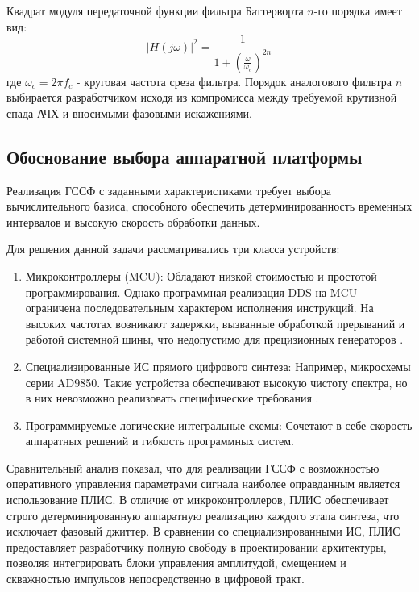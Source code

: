 \documentclass[12pt,a4paper,TimesNewRoman]{article}
\begin{document}
Квадрат модуля передаточной функции фильтра Баттерворта $n$-го порядка имеет вид:
\begin{equation} \label{eq:butterworth}
|H(j\omega)|^2 = \frac{1}{1 + \left(\frac{\omega}{\omega_c}\right)^{2n}}
\end{equation}
где $\omega_c=2\pi f_c$ - круговая частота среза фильтра. Порядок аналогового фильтра $n$ выбирается разработчиком исходя из компромисса между требуемой крутизной спада АЧХ и вносимыми фазовыми искажениями.


\subsection{Обоснование выбора аппаратной платформы}

Реализация ГССФ с заданными характеристиками требует выбора вычислительного базиса, способного обеспечить детерминированность временных интервалов и высокую скорость обработки данных.

Для решения данной задачи рассматривались три класса устройств:
\begin{enumerate}
    \item Микроконтроллеры (MCU): Обладают низкой стоимостью и простотой программирования. Однако программная реализация DDS на MCU ограничена последовательным характером исполнения инструкций. На высоких частотах возникают задержки, вызванные обработкой прерываний и работой системной шины, что недопустимо для прецизионных генераторов \cite{mcu-shit}.
    \item Специализированные ИС прямого цифрового синтеза: Например, микросхемы серии AD9850. Такие устройства обеспечивают высокую чистоту спектра, но в них невозможно реализовать специфические требования \cite{ad9850}.
    \item Программируемые логические интегральные схемы: Сочетают в себе скорость аппаратных решений и гибкость программных систем.
\end{enumerate}

Сравнительный анализ показал, что для реализации ГССФ с возможностью оперативного управления параметрами сигнала наиболее оправданным является использование ПЛИС. В отличие от микроконтроллеров, ПЛИС обеспечивает строго детерминированную аппаратную реализацию каждого этапа синтеза, что исключает фазовый джиттер. В сравнении со специализированными ИС, ПЛИС предоставляет разработчику полную свободу в проектировании архитектуры, позволяя интегрировать блоки управления амплитудой, смещением и скважностью импульсов непосредственно в цифровой тракт.
\end{document}
